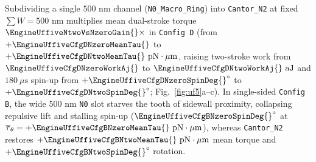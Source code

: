 \documentclass[11pt,a4paper]{article}
\begin{document}
Subdividing a single $500\text{ nm}$ channel (\texttt{N0\_Macro\_Ring}) into \texttt{Cantor\_N2} at fixed $\sum W = 500\text{ nm}$ multiplies mean dual-stroke torque $\EngineUffiveNtwoVsNzeroGain{}\times$ in \texttt{Config D} (from $+\EngineUffiveCfgDNzeroMeanTau{}$ to $+\EngineUffiveCfgDNtwoMeanTau{}\text{ pN}\cdot\mu\text{m}$, raising two-stroke work from $\EngineUffiveCfgDNzeroWorkAj{}$ to $\EngineUffiveCfgDNtwoWorkAj{}\text{ aJ}$ and $180\ \mu\text{s}$ spin-up from $+\EngineUffiveCfgDNzeroSpinDeg{}^\circ$ to $+\EngineUffiveCfgDNtwoSpinDeg{}^\circ$; Fig.~\ref{fig:uf5}a--c). In single-sided \texttt{Config B}, the wide $500\text{ nm}$ \texttt{N0} slot starves the tooth of sidewall proximity, collapsing repulsive lift and stalling spin-up ($\EngineUffiveCfgBNzeroSpinDeg{}^\circ$ at $\overline{\tau}_\theta = +\EngineUffiveCfgBNzeroMeanTau{}\text{ pN}\cdot\mu\text{m}$), whereas \texttt{Cantor\_N2} restores $+\EngineUffiveCfgBNtwoMeanTau{}\text{ pN}\cdot\mu\text{m}$ mean torque and $+\EngineUffiveCfgBNtwoSpinDeg{}^\circ$ rotation.
\end{document}
